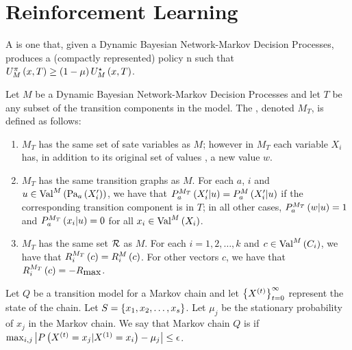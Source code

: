 \section{Reinforcement Learning}

\begin{defi}
A  is one that, given a Dynamic Bayesian Network-Markov Decision Processes, produces a (compactly represented) policy n such that $U_M^{\pi}\left(x,T\right)\geq\left( 1-\mu\right)U_M^{\star}\left(x,T\right)$.
\cite{conf/ijcai/KearnsK99}
\end{defi}

\begin{defi}
Let $M$ be a Dynamic Bayesian Network-Markov Decision Processes and let $T$ be any subset of the transition components in the model. The , denoted $M_T$, is defined as follows:
\begin{enumerate}
 \item $M_T$ has the same set of sate variables as $M$; however in $M_T$ each variable $X_i$ has, in addition to its original set of values , a new value $w$.
 \item $M_T$ has the same transition graphs as $M$. For each $a$, $i$ and $u\in\mbox{Val}^M\left(\mbox{Pa}_a\left(X'_i\right)\right)$, we have that $P_a^{M_T}\left(X_i'|u\right)=P_a^M\left(X_i'|u\right)$ if the corresponding transition component is in $T$; in all other cases, $P_a^{M_T}\left(w|u\right)=1$ and $P_a^{M_T}\left(x_i|u\right)=0$ for all $x_i\in\mbox{Val}^M\left(X_i\right)$.
 \item $M_T$ has the same set $\mathcal{R}$ as $M$. For each $i=1,2,\ldots,k$ and $c\in\mbox{Val}^M\left(C_i\right)$, we have that $R_i^{M_T}\left(c\right)=R_i^M\left(c\right)$. For other vectors $c$, we have that $R_i^{M_T}\left(c\right)=-R_{\mbox{max}}$.
\end{enumerate}
\cite{conf/ijcai/KearnsK99}
\end{defi}

\begin{defi}
Let $Q$ be a transition model for a Markov chain and let $\left\{ X^{\left( t\right)}\right\}_{t=0}^{\infty}$ represent the state of the chain. Let $S=\left\{ x_1,x_2,\ldots,x_s\right\}$. Let $\mu_j$ be the stationary probability of $x_j$ in the Markov chain. We say that Markov chain $Q$ is  if $\max_{i,j}\left|P\left(X^{\left( t\right)}=x_j|X^{\left( 1\right)}=x_i\right)-\mu_j\right|\leq\epsilon$.
\cite{conf/ijcai/KearnsK99}
\end{defi}

